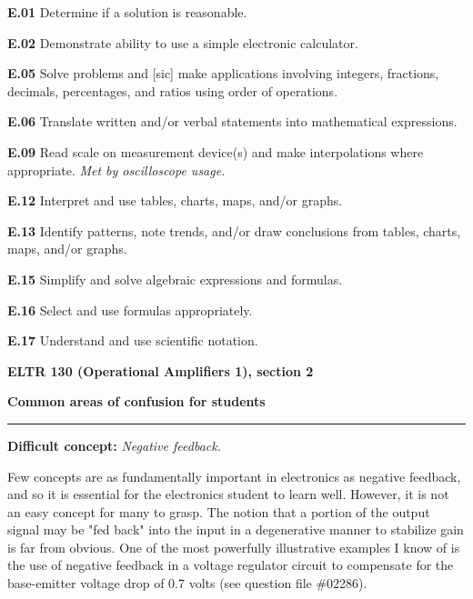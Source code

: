 \item{\bf E.01} Determine if a solution is reasonable.
\item{\bf E.02} Demonstrate ability to use a simple electronic calculator.
\item{\bf E.05} Solve problems and [sic] make applications involving integers, fractions, decimals, percentages, and ratios using order of operations.
\item{\bf E.06} Translate written and/or verbal statements into mathematical expressions.
\item{\bf E.09} Read scale on measurement device(s) and make interpolations where appropriate.  {\it Met by oscilloscope usage.}
\item{\bf E.12} Interpret and use tables, charts, maps, and/or graphs.
\item{\bf E.13} Identify patterns, note trends, and/or draw conclusions from tables, charts, maps, and/or graphs.
\item{\bf E.15} Simplify and solve algebraic expressions and formulas.
\item{\bf E.16} Select and use formulas appropriately.
\item{\bf E.17} Understand and use scientific notation.
\medskip





\vfil \eject

\centerline{\bf ELTR 130 (Operational Amplifiers 1), section 2} \bigskip 
 
\vskip 10pt

\noindent
{\bf Common areas of confusion for students}

\vskip 5pt


\hrule \vskip 5pt

\vskip 10pt

\noindent
{\bf Difficult concept: } {\it Negative feedback.}

Few concepts are as fundamentally important in electronics as negative feedback, and so it is essential for the electronics student to learn well.  However, it is not an easy concept for many to grasp.  The notion that a portion of the output signal may be "fed back" into the input in a degenerative manner to stabilize gain is far from obvious.  One of the most powerfully illustrative examples I know of is the use of negative feedback in a voltage regulator circuit to compensate for the base-emitter voltage drop of 0.7 volts (see question file \#02286).

